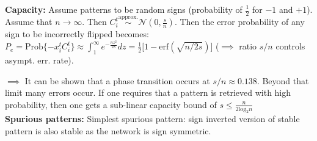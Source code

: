 \textbf{Capacity:} Assume patterns to be random signs (probability of $\frac{1}{2}$ for $-1$ and $+1$). Assume that $n\rightarrow \infty$. Then $C_i^t \overset{\text{approx.}}{\sim}\mathcal{N}(0, \frac{s}{n})$. Then the error probability of any sign to be incorrectly flipped becomes: $P_e = \text{Prob}\{-x_i^tC_i^t\}\approx \int_1^\infty e^{-\frac{nz^2}{2s}}dz=\frac{1}{2}\big[1 - \text{erf}(\sqrt{n/2s})\big]$ ($\implies$ ratio $s/n$ controls asympt. err. rate).


$\implies$ It can be shown that a phase transition occurs at $s/n \approx0.138$. Beyond that limit many errors occur. If one requires that a pattern is retrieved with high probability, then one gets a sub-linear capacity bound of $s\leq \frac{n}{2 \text{log}_2n}$\\
\textbf{Spurious patterns:} Simplest spurious pattern: sign inverted version of stable pattern is also stable as the network is sign symmetric.




